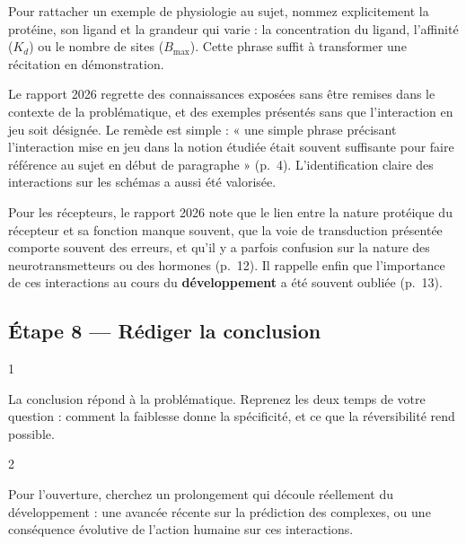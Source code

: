 \documentclass[11pt,a4paper]{article}
\begin{document}
\begin{methode}

Pour rattacher un exemple de physiologie au sujet, nommez explicitement la protéine, son ligand et la grandeur qui varie : la concentration du ligand, l'affinité (\(K_d\)) ou le nombre de sites (\(B_{\max}\)). Cette phrase suffit à transformer une récitation en démonstration.

\end{methode}

\begin{jury}

Le rapport 2026 regrette des connaissances exposées sans être remises dans le contexte de la problématique, et des exemples présentés sans que l'interaction en jeu soit désignée. Le remède est simple : « une simple phrase précisant l'interaction mise en jeu dans la notion étudiée était souvent suffisante pour faire référence au sujet en début de paragraphe » (p.~4). L'identification claire des interactions sur les schémas a aussi été valorisée.

\end{jury}

\begin{jury}

Pour les récepteurs, le rapport 2026 note que le lien entre la nature protéique du récepteur et sa fonction manque souvent, que la voie de transduction présentée comporte souvent des erreurs, et qu'il y a parfois confusion sur la nature des neurotransmetteurs ou des hormones (p.~12). Il rappelle enfin que l'importance de ces interactions au cours du \textbf{développement} a été souvent oubliée (p.~13).

\end{jury}

\hypertarget{uxe9tape-8-ruxe9diger-la-conclusion}{%
\subsection{Étape 8 --- Rédiger la conclusion}\label{uxe9tape-8-ruxe9diger-la-conclusion}}

\begin{indication}{1}

La conclusion répond à la problématique. Reprenez les deux temps de votre question : comment la faiblesse donne la spécificité, et ce que la réversibilité rend possible.

\end{indication}

\begin{indication}{2}

Pour l'ouverture, cherchez un prolongement qui découle réellement du développement : une avancée récente sur la prédiction des complexes, ou une conséquence évolutive de l'action humaine sur ces interactions.

\end{indication}
\end{document}
